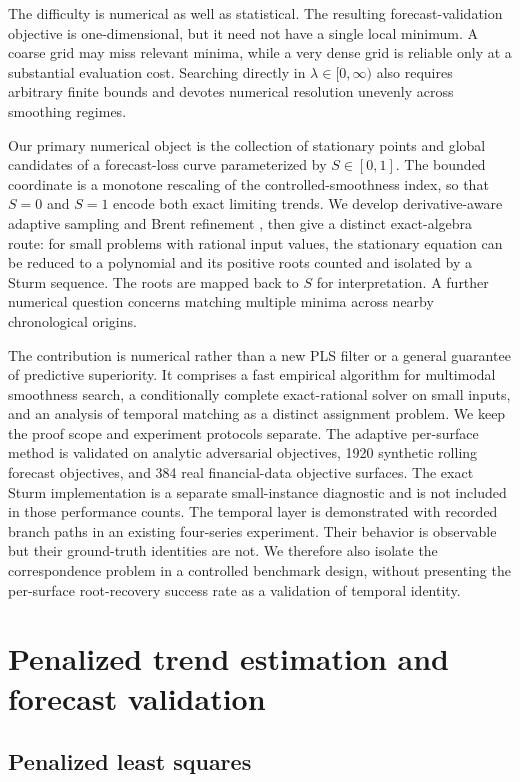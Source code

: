 \documentclass[english]{smcca}
\begin{document}
The difficulty is numerical as well as statistical. The resulting forecast-validation objective is one-dimensional, but it need not have a single local minimum. A coarse grid may miss relevant minima, while a very dense grid is reliable only at a substantial evaluation cost. Searching directly in \(\lambda\in[0,\infty)\) also requires arbitrary finite bounds and devotes numerical resolution unevenly across smoothing regimes.

Our primary numerical object is the collection of stationary points and global candidates of a forecast-loss curve parameterized by $S\in[0,1]$. The bounded coordinate is a monotone rescaling of the controlled-smoothness index, so that $S=0$ and $S=1$ encode both exact limiting trends. We develop derivative-aware adaptive sampling and Brent refinement \cite{brent1971zero}, then give a distinct exact-algebra route: for small problems with rational input values, the stationary equation can be reduced to a polynomial and its positive roots counted and isolated by a Sturm sequence. The roots are mapped back to $S$ for interpretation. A further numerical question concerns matching multiple minima across nearby chronological origins.

The contribution is numerical rather than a new PLS filter or a general guarantee of predictive superiority. It comprises a fast empirical algorithm for multimodal smoothness search, a conditionally complete exact-rational solver on small inputs, and an analysis of temporal matching as a distinct assignment problem. We keep the proof scope and experiment protocols separate. The adaptive per-surface method is validated on analytic adversarial objectives, 1920 synthetic rolling forecast objectives, and 384 real financial-data objective surfaces. The exact Sturm implementation is a separate small-instance diagnostic and is not included in those performance counts. The temporal layer is demonstrated with recorded branch paths in an existing four-series experiment. Their behavior is observable but their ground-truth identities are not. We therefore also isolate the correspondence problem in a controlled benchmark design, without presenting the per-surface root-recovery success rate as a validation of temporal identity.

\section{Penalized trend estimation and forecast validation}

\subsection{Penalized least squares}
\end{document}

